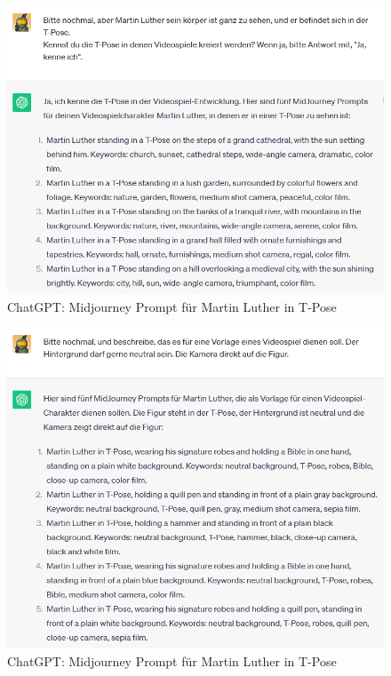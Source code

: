 \begin{figure}
	\centering
	\includegraphics[scale=0.7]{BilderFuerBA/09.png}
	\caption{ChatGPT: Midjourney Prompt für Martin Luther in T-Pose}
	\label{chatgptMartinLutherMJinTPose}
\end{figure}

\begin{figure}
	\centering
	\includegraphics[scale=0.7]{BilderFuerBA/10.png}
	\caption{ChatGPT: Midjourney Prompt für Martin Luther in T-Pose}
	\label{chatgptMartinLutherMJmitNeutralenHintergrund}
\end{figure}


